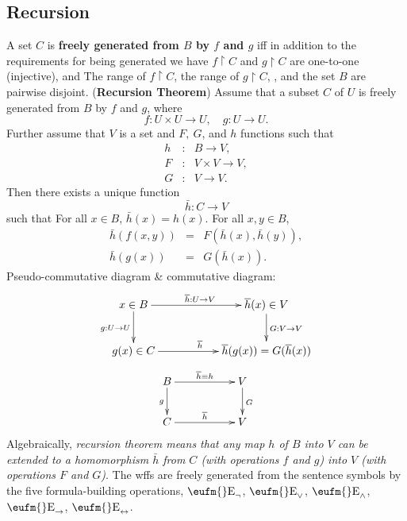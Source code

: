 \documentclass{myproc}
\def\EE{\mbox{\eufm{}E}}
\begin{document}
\subsection{Recursion}
\bit
\w A set $C$ is {\bf{}freely generated from $B$ by $f$ and $g$} iff
	in addition to the requirements for being generated we have
	\bit
	\w [(a)] $f \upharpoonright C$ and 
		$g \upharpoonright C$ are one-to-one (injective), and
	\w [(b)] The range of $f \upharpoonright C$, 
		the range of $g \upharpoonright C$, , and the set $B$ are
		pairwise disjoint.
	\eit
\w ({\bf{}Recursion Theorem})
	Assume that a subset $C$ of $U$ is freely generated from $B$
	by $f$ and $g$, where
		\[ f: U\times{U} \rightarrow U, \quad
			g: U \rightarrow U.\]
	Further assume that $V$ is a set and $F,\ G$, and $h$ functions
		such that
		\begin{eqnarray*}
		h &: & B \rightarrow V, \\
		F &: & V \times V \rightarrow V, \\
		G &: & V \rightarrow V.
		\end{eqnarray*}
	Then there exists a unique function
		\[ \bar{h}: C \rightarrow V \]
	such that
		\ben
		\w [(a)] For all $x \in B$, $\bar{h}(x) = h(x)$.
		\w [(b)] For all $x, y \in B$, 
			\begin{eqnarray*}
			\bar{h}(f(x, y)) & = & F(\bar{h}(x), \bar{h}(y)), \\
			\bar{h}(g(x)) & = & G(\bar{h}(x)).
			\end{eqnarray*}
		\een
	\bit
	\w Pseudo-commutative diagram \& commutative diagram:
			\[ \xymatrix{
				x \in B \ar[d]_{g: U \rightarrow U} 
				\ar[rr]^{\overline{h}: U \rightarrow V} 
					& &  \overline{h}(x) \in V
					\ar[d]^{G: V \rightarrow V} \\
				g(x) \in C \ar[rr]^{\overline{h}} & &
				\overline{h}(g(x)) = G(\overline{h}(x)) 
			}\]
			\[ \xymatrix{
				B \ar[d]_{g} 
				\ar[rr]^{\overline{h} \equiv h} 
					& &  V
					\ar[d]^{G} \\
				C \ar[rr]^{\overline{h}} & & V
			}\]
	\w Algebraically, {\em{}recursion 
		theorem means that any map $h$ of
		$B$ into $V$ can be extended to a homomorphism $\bar{h}$
		from $C$ (with operations $f$ and $g$) into $V$
		(with operations $F$ and $G$)\/}.
	\eit
\w The wffs are freely generated from the sentence symbols
	by the five formula-building operations, 
	$\EE_\neg$, $\EE_\vee$, $\EE_\wedge$, $\EE_\rightarrow$, $\EE_\leftrightarrow$.
\eit
\end{document}
